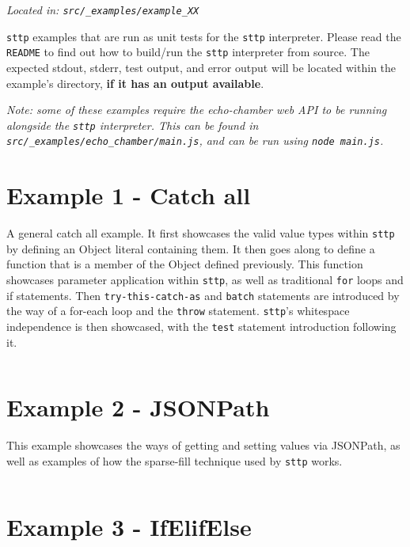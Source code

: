 \documentclass[]{full}
\theoremstyle{definition}
\begin{document}
\cprotect\textit{Located in: \verb|src/_examples/example_XX|}

\verb|sttp| examples that are run as unit tests for the \verb|sttp| interpreter. Please read the \verb|README| to find out how to build/run the \verb|sttp| interpreter from source. The expected stdout, stderr, test output, and error output will be located within the example's directory, \textbf{if it has an output available}.

\cprotect\textit{Note: some of these examples require the echo-chamber web API to be running alongside the \verb|sttp| interpreter. This can be found in \verb|src/_examples/echo_chamber/main.js|, and can be run using \verb|node main.js|.}

\section{Example 1 - Catch all}
\label{appendix:sttp-examples-1}

A general catch all example. It first showcases the valid value types within \verb|sttp| by defining an Object literal containing them. It then goes along to define a function that is a member of the Object defined previously. This function showcases parameter application within \verb|sttp|, as well as traditional \verb|for| loops and if statements. Then \verb|try-this-catch-as| and \verb|batch| statements are introduced by the way of a for-each loop and the \verb|throw| statement. \verb|sttp|'s whitespace independence is then showcased, with the \verb|test| statement introduction following it.

\inputminted[autogobble, breaklines, tabsize=4]{text}{../../src/_examples/example_01/example_01.sttp}

\section{Example 2 - JSONPath}
\label{appendix:sttp-examples-2}

This example showcases the ways of getting and setting values via JSONPath, as well as examples of how the sparse-fill technique used by \verb|sttp| works.

\inputminted[autogobble, breaklines, tabsize=4]{text}{../../src/_examples/example_02/example_02.sttp}

\section{Example 3 - IfElifElse}
\label{appendix:sttp-examples-3}
\end{document}
